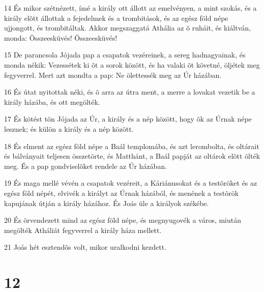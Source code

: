 \par 14 És mikor szétnézett, ímé a király ott állott az emelvényen, a mint szokás, és a király elõtt állottak a fejedelmek és a trombitások, és az egész föld népe ujjongott, és trombitáltak. Akkor megszaggatá Athália az õ ruháit, és kiáltván, monda: Összeesküvés! Összeesküvés!
\par 15 De parancsola Jójada pap a csapatok vezéreinek, a sereg hadnagyainak, és monda nékik: Vezessétek ki õt a sorok között, és ha valaki õt követné, öljétek meg fegyverrel. Mert azt mondta a pap: Ne ölettessék meg az Úr házában.
\par 16 És útat nyitottak néki, és õ arra az útra ment, a merre a lovakat vezetik be a király házába, és ott megölték.
\par 17 És kötést tõn Jójada az Úr, a király és a nép között, hogy õk az Úrnak népe lesznek; és külön a király és a nép között.
\par 18 És elment az egész föld népe a Baál templomába, és azt lerombolta, és oltárait és bálványait teljesen összetörte, és Matthánt, a Baál  papját az oltárok elõtt ölték meg. És a pap gondviselõket rendele az Úr házában.
\par 19 És maga mellé vévén a csapatok vezéreit, a Káriánusokat és a testõröket és az egész föld népét, elvivék a királyt az Úrnak házából, és menének a testõrök kapujának útján a király házához. És Joás üle a királyok székébe.
\par 20 És örvendezett mind az egész föld népe, és megnyugovék a város, miután megölték Atháliát fegyverrel a király háza mellett.
\par 21 Joás hét esztendõs volt, mikor uralkodni kezdett.

\chapter{12}

